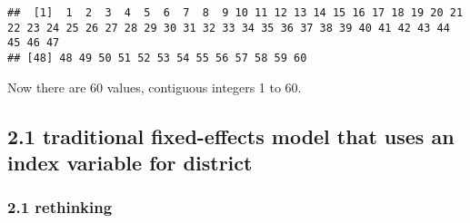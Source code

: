 \documentclass[
]{article}
\newenvironment{Shaded}{\begin{snugshade}}{\end{snugshade}}
\newcommand{\DataTypeTok}[1]{\textcolor[rgb]{0.13,0.29,0.53}{#1}}
\newcommand{\DecValTok}[1]{\textcolor[rgb]{0.00,0.00,0.81}{#1}}
\newcommand{\FloatTok}[1]{\textcolor[rgb]{0.00,0.00,0.81}{#1}}
\newcommand{\KeywordTok}[1]{\textcolor[rgb]{0.13,0.29,0.53}{\textbf{#1}}}
\newcommand{\NormalTok}[1]{#1}
\newcommand{\OperatorTok}[1]{\textcolor[rgb]{0.81,0.36,0.00}{\textbf{#1}}}
\newcommand{\OtherTok}[1]{\textcolor[rgb]{0.56,0.35,0.01}{#1}}
\newcommand{\StringTok}[1]{\textcolor[rgb]{0.31,0.60,0.02}{#1}}
\begin{document}
\begin{verbatim}
##  [1]  1  2  3  4  5  6  7  8  9 10 11 12 13 14 15 16 17 18 19 20 21 22 23 24 25 26 27 28 29 30 31 32 33 34 35 36 37 38 39 40 41 42 43 44 45 46 47
## [48] 48 49 50 51 52 53 54 55 56 57 58 59 60
\end{verbatim}

Now there are 60 values, contiguous integers 1 to 60.

\hypertarget{traditional-fixed-effects-model-that-uses-an-index-variable-for-district}{%
\subsection{2.1 traditional fixed-effects model that uses an index
variable for
district}\label{traditional-fixed-effects-model-that-uses-an-index-variable-for-district}}

\hypertarget{rethinking-5}{%
\subsubsection{2.1 rethinking}\label{rethinking-5}}

\begin{Shaded}
\end{Shaded}
\end{document}
